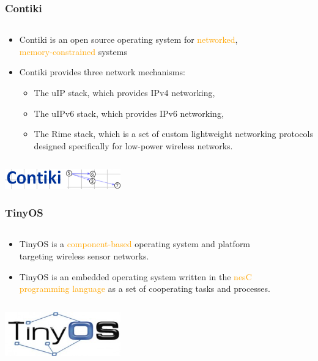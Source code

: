 \documentclass{beamer}
\begin{document}
\begin{frame}
	\frametitle{Contiki}
	\begin{columns}[c]
		\begin{column}{30cm}
			\vspace{.1cm}
			\begin{itemize}
				\justifying
				\item Contiki is an open source operating system for \textcolor{orange}{networked},\\
				\textcolor{orange}{memory-constrained} systems
				\item Contiki provides three network mechanisms:
				\begin{itemize}
					\justifying
					\item The uIP stack, which provides IPv4 networking,
					\item The uIPv6 stack, which provides IPv6 networking,
					\item The Rime stack, which is a set of custom lightweight networking protocols\\
					designed specifically for low-power wireless networks.
				\end{itemize}
			\end{itemize}
		\end{column}
	\end{columns}
	\vspace{.5cm}
	\hspace*{5.5cm} \includegraphics[width=5cm]{figs/contiki-logo.png}
\end{frame}

\begin{frame}
	\frametitle{TinyOS}
	\begin{columns}[c]
		\begin{column}{30cm}
			\vspace{.1cm}
			\begin{itemize}
				\justifying
				\item TinyOS is a \textcolor{orange}{component-based} operating system and platform\\
				targeting wireless sensor networks.
				\item TinyOS is an embedded operating system written in the \textcolor{orange}{nesC}\\
				\textcolor{orange}{programming language} as a set of cooperating tasks and processes.
			\end{itemize}
		\end{column}
	\end{columns}
	\vspace{.5cm}
	\hspace*{5.5cm} \includegraphics[width=5cm]{figs/tinyos-logo.jpg}
\end{frame}
\end{document}
